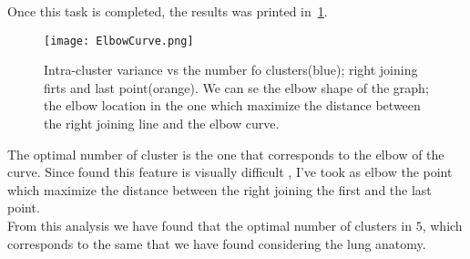 \documentclass{standalone}
\begin{document}
	Once this task is completed, the results was printed in \figurename\,\ref{fig:ElbowCurve}. 
	
	\begin{figure}[h!]
		\centering
		\texttt{[image: ElbowCurve.png]}
		\caption{Intra-cluster variance vs the number fo clusters(blue); right joining firts and last point(orange). We can se the elbow shape of the graph; the elbow location in the one which maximize the distance between the right joining line and the elbow curve.}\label{fig:ElbowCurve}
	\end{figure}

	The optimal number of cluster is the one that corresponds to the elbow of the curve. Since found this feature is visually difficult , I've took as elbow the point which maximize the distance between the right joining the first and the last point.\\
	From this analysis we have found that the optimal number of clusters in $5$, which corresponds to the same that we have found considering the lung anatomy.
	
\end{document}

